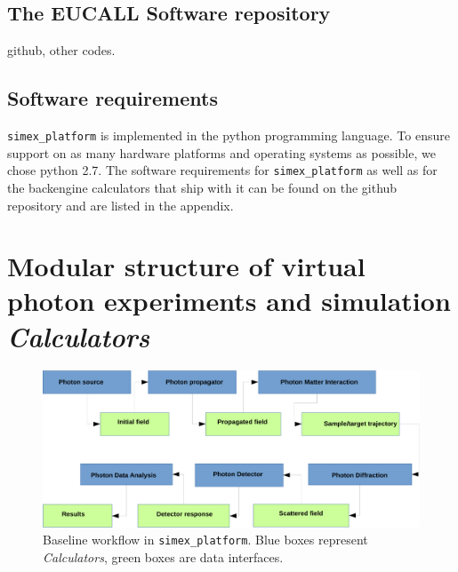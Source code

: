 \documentclass[12pt]{scrartcl}
\begin{document}
\subsection{The EUCALL Software repository}
github, other codes.

\subsection{Software requirements}
\texttt{simex\_platform} is implemented in the python programming language. To
ensure support on as many hardware platforms and operating systems as possible,
we chose python 2.7. The software requirements for
\texttt{simex\_platform} as well as for the backengine calculators that ship
with it can be found on the github repository \cite{simex_github} and are listed
in the appendix.
%
\section{Modular structure of virtual photon experiments and simulation
  \textit{Calculators}}
\begin{figure}[ht]
  \begin{center}
    \includegraphics[width=1.0\textwidth,angle=0,clip]{simex_baseline_workflow-crop}
  \end{center}
\caption{Baseline workflow in \texttt{simex\_platform}. Blue boxes represent
\textit{Calculators}, green boxes are data interfaces.}
  \label{fig:simex_baseline_workflow}
\end{figure}
\end{document}
